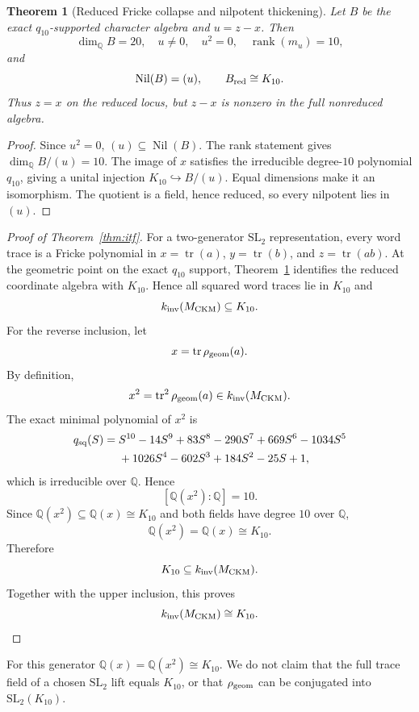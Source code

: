 \documentclass[11pt]{article}
\newtheorem{theorem}{Theorem}[section]\newtheorem{proposition}[theorem]{Proposition}
\newcommand{\Q}{\mathbb Q}\newcommand{\Z}{\mathbb Z}\newcommand{\C}{\mathbb C}
\newcommand{\M}{M_{\rm CKM}}\newcommand{\K}{K_{10}}\newcommand{\kinv}{k_{\rm inv}}
\begin{document}
\begin{theorem}[Reduced Fricke collapse and nilpotent thickening]\label{thm:red}
Let $B$ be the exact $q_{10}$-supported character algebra and $u=z-x$.
Then
\[
\dim_\Q B=20,\quad u\ne0,\quad u^2=0,\quad\operatorname{rank}(m_u)=10,
\]
and
\[
\operatorname{Nil}(B)=(u),\qquad B_{\rm red}\cong K_{10}.
\]
Thus $z=x$ on the reduced locus, but $z-x$ is nonzero in the full
nonreduced algebra.
\end{theorem}
\begin{proof}
Since $u^2=0$, $(u)\subseteq\operatorname{Nil}(B)$. The rank statement
gives $\dim_\Q B/(u)=10$. The image of $x$ satisfies the irreducible
degree-$10$ polynomial $q_{10}$, giving a unital injection
$K_{10}\hookrightarrow B/(u)$. Equal dimensions make it an isomorphism.
The quotient is a field, hence reduced, so every nilpotent lies in $(u)$.
\end{proof}

\begin{proof}[Proof of Theorem~\ref{thm:itf}]
For a two-generator $\mathrm{SL}_2$ representation, every word trace is a
Fricke polynomial in $x=\operatorname{tr}(a)$,
$y=\operatorname{tr}(b)$, and $z=\operatorname{tr}(ab)$. At the geometric
point on the exact $q_{10}$ support, Theorem~\ref{thm:red} identifies the
reduced coordinate algebra with $K_{10}$. Hence all squared word traces
lie in $K_{10}$ and
\[
\kinv(\M)\subseteq K_{10}.
\]
For the reverse inclusion, let
\[
x=\operatorname{tr}\rho_{\rm geom}(a).
\]
By definition,
\[
x^2=\operatorname{tr}^2\rho_{\rm geom}(a)\in\kinv(\M).
\]
The exact minimal polynomial of $x^2$ is
\[
\begin{aligned}
q_{\rm sq}(S)={}&S^{10}-14S^9+83S^8-290S^7+669S^6-1034S^5\\
&+1026S^4-602S^3+184S^2-25S+1,
\end{aligned}
\]
which is irreducible over $\Q$. Hence
\[
[\Q(x^2):\Q]=10.
\]
Since $\Q(x^2)\subseteq\Q(x)\cong K_{10}$ and both fields have degree
$10$ over $\Q$,
\[
\Q(x^2)=\Q(x)\cong K_{10}.
\]
Therefore
\[
K_{10}\subseteq\kinv(\M).
\]
Together with the upper inclusion, this proves
\[
\kinv(\M)\cong K_{10}.
\]
\end{proof}

\begin{remark}
For this generator $\Q(x)=\Q(x^2)\cong K_{10}$. We do not claim that the
full trace field of a chosen $\mathrm{SL}_2$ lift equals $K_{10}$, or that
$\rho_{\rm geom}$ can be conjugated into $\mathrm{SL}_2(K_{10})$.
\end{remark}
\end{document}
